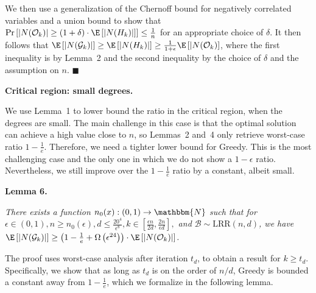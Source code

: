 We then use a generalization of the Chernoff bound for negatively correlated variables and a union bound to show that $\Pr\left[|N(\mathcal{O}_{k})|\geq(1+\delta)\cdot\E\left[|N(H_{k})|\right]\right]\leq\frac{1}{n}$ for an appropriate choice of $\delta$.
It then follows that
$\E\left[|N(\mathcal{G}_{k})|\right]\geq\E\left[|N(H_{k})|\right]\geq\frac{1}{1+\epsilon}\E\left[|N(\mathcal{O}_{k})\right]$, where the first inequality is by Lemma 2 and the second inequality by the choice of $\delta$ and the assumption on $n$.
\ensuremath{\blacksquare}\par






\par\medskip\noindent\textbf{Critical region: small degrees.}\par




We use Lemma 1 to lower bound the ratio in the critical region, when the degrees are small.
The main challenge in this case is that the optimal solution can achieve a high value close to $n$, so Lemmas 2 and 4 only retrieve worst-case ratio $1-\frac{1}{e}$.
Therefore, we need a tighter lower bound for Greedy.
This is the most challenging case and the only one in which we do not show a $1-\epsilon$ ratio. Nevertheless, we still improve over the $1-\frac{1}{e}$ ratio by a constant, albeit small.\par





\par\medskip\noindent\textbf{\textbf{Lemma 6}\textbf{.}}\par



\emph{There exists a function $n_{0}(x):(0,1)\rightarrow\mathbbm{N}$ such that for $\epsilon\in(0,1),n\geq n_{0}(\epsilon),d\leq\frac{20^{4}}{\epsilon^{8}},k\in\left[\frac{\epsilon n}{2d},\frac{2n}{\epsilon d}\right],$ and $\mathcal{B}\sim\text{{LRR}}(n,d)$, we have $\E\left[|N(\mathcal{G}_{k})|\right]\geq\left(1-\frac{1}{e}+\Omega\left(\epsilon^{24}\right)\right)\cdot\E\left[|N(\mathcal{O}_{k})|\right]$.}\par






The proof uses worst-case analysis after iteration $t_{d}$, to obtain a result for $k\geq t_{d}$.
Specifically, we show that as long as $t_{d}$ is on the order of $n/d$, Greedy is bounded a constant away from $1-\frac{1}{e}$, which we formalize in the following lemma.\par



